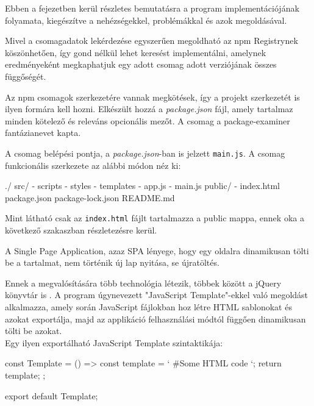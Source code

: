 
Ebben a fejezetben kerül részletes bemutatásra a program implementációjának folyamata, kiegészítve a nehézségekkel, problémákkal és azok megoldásával. 

Mivel a csomagadatok lekérdezése egyszerűen megoldható az npm Registrynek köszönhetően, így gond nélkül lehet keresést implementálni, amelynek eredményeként megkaphatjuk egy adott csomag adott verziójának összes függőségét.

Az npm csomagok szerkezetére vannak megkötések, így a projekt szerkezetét is ilyen formára kell hozni. Elkészült hozzá a \emph{package.json} fájl, amely tartalmaz minden kötelező és releváns opcionális mezőt. A csomag a package-examiner fantázianevet kapta.   

A csomag belépési pontja, a \emph{package.json}-ban is jelzett \texttt{main.js}. A csomag funkcionális szerkezete az alábbi módon néz ki:

\begin{js}
./	
  src/
    - scripts
    - styles
    - templates
    - app.js
    - main.js
  public/
    - index.html
  package.json
  package-lock.json
  README.md	
\end{js}

\noindent Mint látható csak az \texttt{index.html} fájlt tartalmazza a public mappa, ennek oka a következő szakaszban részletezésre kerül.

\pagebreak


A Single Page Application, azaz SPA lényege, hogy egy oldalra dinamikusan tölti be a tartalmat, nem történik új lap nyitása, se újratöltés.

Ennek a megvalósítására több technológia létezik, többek között a jQuery könyvtár is \cite{jquery}. A program úgynevezett "JavaScript Template"-ekkel való megoldást alkalmazza, amely során JavaScript fájlokban hoz létre HTML sablonokat és azokat exportálja, majd az applikáció felhasználási módtól függően dinamikusan tölti be azokat.\\

Egy ilyen exportálható JavaScript Template szintaktikája:

\begin{js}
const Template = () => {
  const template = `
  #Some HTML code
  `;
  return template;
};

export default Template;
\end{js}

